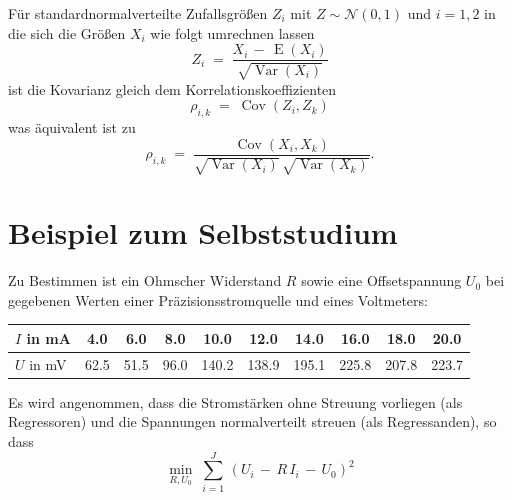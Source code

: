 Für standardnormalverteilte Zufallsgrößen $Z_i$ mit $Z \sim \mathcal{N}(0,1)$ 
und $i = 1,2$ in die sich
die Größen $X_i$ wie folgt umrechnen lassen
\begin{equation}
Z_i \; = \; \frac{X_i \, - \, \operatorname{E}(X_i)}{\sqrt{\operatorname {Var}(X_{i})}}
\end{equation}
ist die Kovarianz gleich dem Korrelationskoeffizienten
\begin{equation}
\rho_{i,k} \; = \; \operatorname {Cov}(Z_{i},Z_{k})
\end{equation}
was äquivalent ist zu
\begin{equation}
\rho_{i,k} \; = \; \frac{\operatorname {Cov}(X_{i},X_{k})}{\sqrt{\operatorname {Var}(X_{i})} \, \sqrt{\operatorname {Var}(X_{k})}} .
\end{equation}


\section{Beispiel zum Selbststudium}
Zu Bestimmen ist ein Ohmscher Widerstand $R$ sowie eine Offsetspannung $U_0$ bei gegebenen Werten einer
Präzisionsstromquelle und eines Voltmeters:

\begin{center}
\begin{tabular}{l||c|c|c|c|c|c|c|c|c}
\hline\hline
 $I$ in mA &    4.0 &     6.0 &     8.0 &    10.0 &    12.0 &    14.0 &    16.0 &    18.0 &    20.0\\
\hline
 $U$ in mV &    62.5 &    51.5 &    96.0 &   140.2 &   138.9 &   195.1 &   225.8 &   207.8 &   223.7 \\
\hline\hline
\end{tabular}
\end{center}

Es wird angenommen, dass die Stromstärken ohne Streuung vorliegen (als Regressoren) und die Spannungen normalverteilt
streuen (als Regressanden), so dass
\begin{equation}
\min_{R, U_0} \; \sum_{i = 1}^J \, \left(U_i \, - \, R \, I_i  \, - \,  U_0\right)^2
\label{regrGer}
\end{equation}

